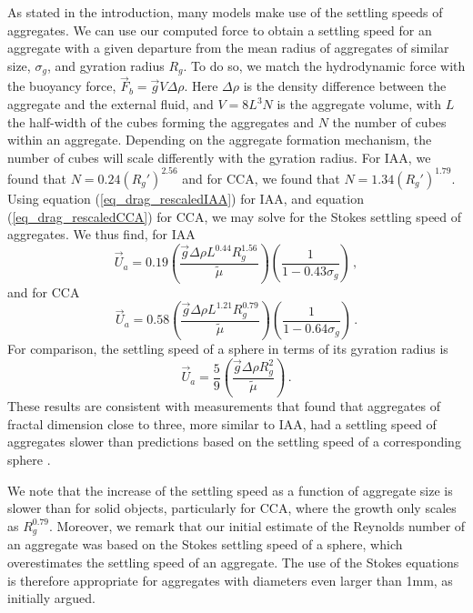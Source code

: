As stated in the introduction, many models make use of the settling speeds of aggregates. We can use our computed force to obtain a settling speed for an aggregate with a given departure from the mean radius of aggregates of similar size, $\sigma_g$, and gyration radius $R_g$. To do so, we match the hydrodynamic force with the buoyancy force, $\vec{F}_b = \vec{g} V \Delta \rho$. Here $\Delta \rho$ is the density difference between the aggregate and the external fluid, and $V=8L^3N$ is the aggregate volume, with $L$ the half-width of the cubes forming the aggregates and $N$ the number of cubes within an aggregate. Depending on the aggregate formation mechanism, the number of cubes will scale differently with the gyration radius. For IAA, we found that $N=0.24(R_g')^{2.56}$ and for CCA, we found that $N=1.34 (R_g')^{1.79}$. Using equation (\ref{eq_drag_rescaledIAA}) for IAA, and equation (\ref{eq_drag_rescaledCCA}) for CCA, we may solve for the Stokes settling speed of aggregates. We thus find, for IAA
\begin{equation}
\vec{U}_a = 0.19  \left( \frac{\vec{g} \Delta \rho L^{0.44} R_g^{1.56}}{\tilde{\mu}} \right)  \left( \frac{1}{1-0.43\sigma_g}  \right)\,,
\end{equation}
and for CCA
\begin{equation}
\vec{U}_a = 0.58 \left( \frac{\vec{g} \Delta \rho L^{1.21} R_g^{0.79}}{\tilde{\mu}}  \right) \left( \frac{1}{1-0.64\sigma_g}  \right)\, .
\end{equation}
For comparison, the settling speed of a sphere in terms of its gyration radius is  
\begin{equation}
\vec{U}_a = \frac{5}{9} \left( \frac{\vec{g} \Delta \rho R_g^2}{\tilde{\mu}}  \right) \,.
\end{equation}
These results are consistent with measurements that found that aggregates of fractal dimension close to three, more similar to IAA, had a settling speed of aggregates slower than predictions based on the settling speed of a corresponding sphere \cite{alldredge_situ_1988}.

We note that the increase of the settling speed as a function of aggregate size is slower than for solid objects, particularly for CCA, where the growth only scales as $R_g^{0.79}$. Moreover, we remark that our initial estimate of the Reynolds number of an aggregate was based on the Stokes settling speed of a sphere, which overestimates the settling speed of an aggregate. The use of the Stokes equations is therefore appropriate for aggregates with diameters even larger than 1mm, as initially argued.
 
